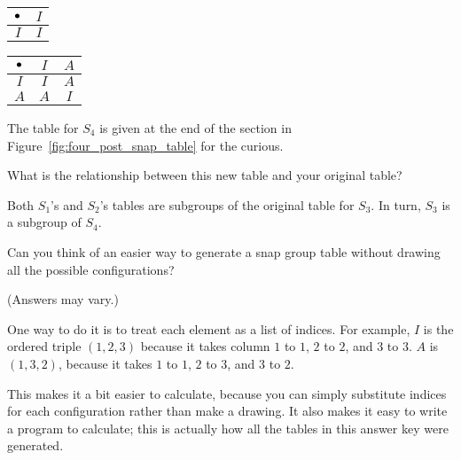 \documentclass[../gatm_answers.tex]{subfiles}
\begin{document}
\begin{center}
	\begin{minipage}{0.45\textwidth}
		\centering
		\begin{tabular}{c|c}
			\hline
			$\bullet$ & $I$ \\ \hline
			\rowcolor{light-gray}
			$I$ & $I$ \\ \hline
		\end{tabular}
	\end{minipage}
	\hfill
	\begin{minipage}{0.45\textwidth}
		\centering
		\begin{tabular}{c|cc}
			\hline
			$\bullet$ & $I$ & $A$ \\ \hline
			\rowcolor{light-gray}
			$I$ & $I$ & $A$ \\
			$A$ & $A$ & $I$ \\ \hline
		\end{tabular}
	\end{minipage}
\end{center}

\noindent The table for $S_4$ is given at the end of the section in Figure~\ref{fig:four_post_snap_table} for the curious.

\begin{inner_problem}
	\item What is the relationship between this new table and your original table?
\end{inner_problem}

\noindent Both $S_1$'s and $S_2$'s tables are subgroups of the original table for $S_3$. In turn, $S_3$ is a subgroup of $S_4$.

\begin{outer_problem}
	\item Can you think of an easier way to generate a snap group table without drawing all the possible configurations?
\end{outer_problem}

\noindent (Answers may vary.)

One way to do it is to treat each element as a list of indices. For example, $I$ is the ordered triple $(1,2,3)$ because it takes column $1$ to $1$, $2$ to $2$, and $3$ to $3$. $A$ is $(1,3,2)$, because it takes $1$ to $1$, $2$ to $3$, and $3$ to $2$.

This makes it a bit easier to calculate, because you can simply substitute indices for each configuration rather than make a drawing. It also makes it easy to write a program to calculate; this is actually how all the tables in this answer key were generated.
\end{document}

